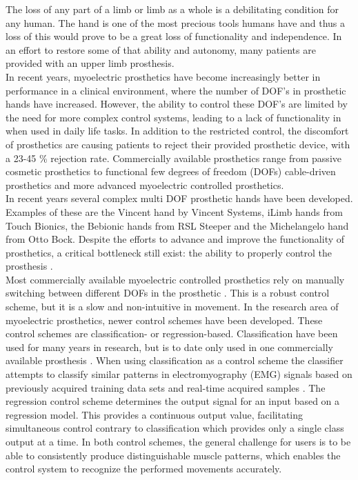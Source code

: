 The loss of any part of a limb or limb as a whole is a debilitating condition for any human. The hand is one of the most precious tools humans have and thus a loss of this would prove to be a great loss of functionality and independence. In an effort to restore some of that ability and autonomy, many patients are provided with an upper limb prosthesis. \cite{Peerdeman2011} \\
In recent years, myoelectric prosthetics have become increasingly better in performance in a clinical environment, where the number of DOF’s in prosthetic hands have increased. However, the ability to control these DOF’s are limited by the need for more complex control systems, leading to a lack of functionality in when used in daily life tasks. In addition to the restricted control, the discomfort of prosthetics are causing patients to reject their provided prosthetic device, with a 23-45 \% rejection rate. \cite{Biddiss2007} Commercially available prosthetics range from passive cosmetic prosthetics to functional few degrees of freedom (DOFs) cable-driven prosthetics and more advanced myoelectric controlled prosthetics. \\
In recent years several complex multi DOF prosthetic hands have been developed. Examples of these are the Vincent hand by Vincent Systems, iLimb hands from Touch Bionics, the Bebionic hands from RSL Steeper and the Michelangelo hand from Otto Bock. \cite{Belter2013} Despite the efforts to advance and improve the functionality of prosthetics, a critical bottleneck still exist: the ability to properly control the prosthesis \cite{Hwang2017}. \\
Most commercially available myoelectric controlled prosthetics rely on manually switching between different DOFs in the prosthetic \cite{Fougner2012}. This is a robust control scheme, but it is a slow and non-intuitive in movement. In the research area of myoelectric prosthetics, newer control schemes have been developed. %
These control schemes are classification- or regression-based. Classification have been used for many years in research, but is to date only used in one commercially available prosthesis \cite{Coapt2018}. When using classification as a control scheme the classifier attempts to classify similar patterns in electromyography (EMG) signals based on previously acquired training data sets and real-time acquired samples \cite{Fougner2012, Scheme2015}. The regression control scheme determines the output signal for an input based on a regression model. This provides a continuous output value, facilitating simultaneous control contrary to classification which provides only a single class output at a time. \cite{Hwang2017, Hahne2014} In both control schemes, the general challenge for users is to be able to consistently produce distinguishable muscle patterns, which enables the control system to recognize the performed movements accurately. \cite{Powell2014} \\
